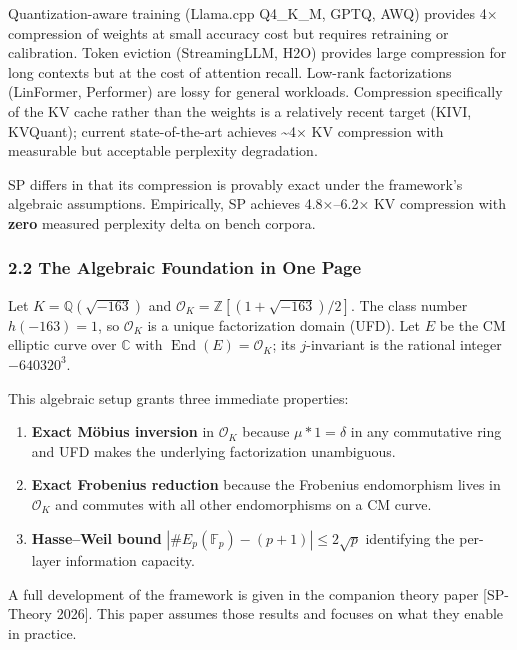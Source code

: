 \documentclass[
  11pt,
]{article}
\providecommand{\tightlist}{%
  \setlength{\itemsep}{0pt}\setlength{\parskip}{0pt}}
\begin{document}
Quantization-aware training (Llama.cpp Q4\_K\_M, GPTQ, AWQ) provides 4×
compression of weights at small accuracy cost but requires retraining or
calibration. Token eviction (StreamingLLM, H2O) provides large
compression for long contexts but at the cost of attention recall.
Low-rank factorizations (LinFormer, Performer) are lossy for general
workloads. Compression specifically of the KV cache rather than the
weights is a relatively recent target (KIVI, KVQuant); current
state-of-the-art achieves \textasciitilde4× KV compression with
measurable but acceptable perplexity degradation.

SP differs in that its compression is provably exact under the
framework's algebraic assumptions. Empirically, SP achieves 4.8×--6.2×
KV compression with \textbf{zero} measured perplexity delta on bench
corpora.

\hypertarget{the-algebraic-foundation-in-one-page}{%
\subsubsection{2.2 The Algebraic Foundation in One
Page}\label{the-algebraic-foundation-in-one-page}}

Let \(K = \mathbb{Q}(\sqrt{-163})\) and
\(\mathcal{O}_K = \mathbb{Z}[(1 + \sqrt{-163})/2]\). The class number
\(h(-163) = 1\), so \(\mathcal{O}_K\) is a unique factorization domain
(UFD). Let \(E\) be the CM elliptic curve over \(\mathbb{C}\) with
\(\operatorname{End}(E) = \mathcal{O}_K\); its \(j\)-invariant is the
rational integer \(-640320^3\).

This algebraic setup grants three immediate properties:

\begin{enumerate}
\def\labelenumi{\arabic{enumi}.}
\tightlist
\item
  \textbf{Exact Möbius inversion} in \(\mathcal{O}_K\) because
  \(\mu * 1 = \delta\) in any commutative ring and UFD makes the
  underlying factorization unambiguous.
\item
  \textbf{Exact Frobenius reduction} because the Frobenius endomorphism
  lives in \(\mathcal{O}_K\) and commutes with all other endomorphisms
  on a CM curve.
\item
  \textbf{Hasse--Weil bound}
  \(|\#E_p(\mathbb{F}_p) - (p+1)| \leq 2\sqrt{p}\) identifying the
  per-layer information capacity.
\end{enumerate}

A full development of the framework is given in the companion theory
paper {[}SP-Theory 2026{]}. This paper assumes those results and focuses
on what they enable in practice.
\end{document}
